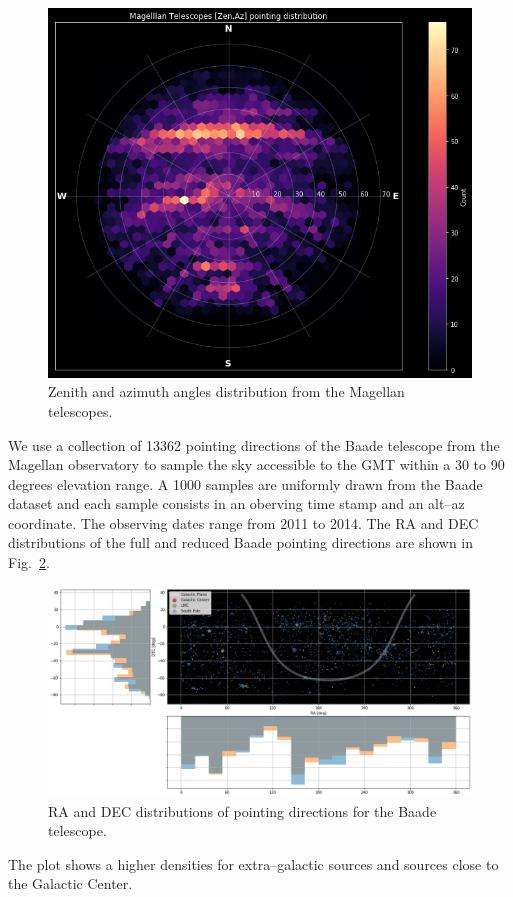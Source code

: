 \documentclass{gmto}
\begin{document}
\begin{figure}
  \centering
  \includegraphics[width=0.8\linewidth]{zenaz_distribution.png}
  \caption{Zenith and azimuth angles distribution from the Magellan telescopes.}
  \label{fig:9}
\end{figure}
We use a collection of 13362 pointing directions of the Baade telescope from
the Magellan observatory to sample the sky accessible to the GMT within a 30 to
90 degrees elevation range.
A 1000 samples are uniformly drawn from the Baade dataset and each sample consists
in an oberving time stamp and an alt--az coordinate.
The observing dates range from 2011 to 2014.
The RA and DEC distributions of the full and reduced Baade pointing directions are
shown in Fig.~\ref{fig:3}.
\begin{figure}
  \centering
  \includegraphics[angle=-90,scale=0.45]{standard_year_Baade_pointing_distribution}
  \caption{RA and DEC distributions of pointing directions for the Baade
    telescope.}
  \label{fig:3}
\end{figure}
The plot shows a higher densities for extra--galactic sources and sources close
to the Galactic Center.
\end{document}
